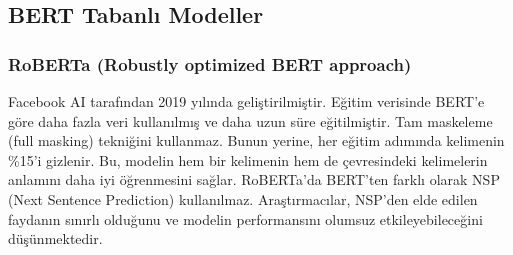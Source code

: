 \subsection{BERT Tabanlı Modeller}

\subsubsection{RoBERTa (Robustly optimized BERT approach)}
Facebook AI tarafından 2019 yılında geliştirilmiştir. Eğitim verisinde BERT'e göre daha fazla veri kullanılmış ve daha uzun süre eğitilmiştir. Tam maskeleme (full masking) tekniğini kullanmaz. Bunun yerine, her eğitim adımında kelimenin \%15'i gizlenir. Bu, modelin hem bir kelimenin hem de çevresindeki kelimelerin anlamını daha iyi öğrenmesini sağlar. RoBERTa'da BERT'ten farklı olarak NSP (Next Sentence Prediction) kullanılmaz. Araştırmacılar, NSP'den elde edilen faydanın sınırlı olduğunu ve modelin performansını olumsuz etkileyebileceğini düşünmektedir.

